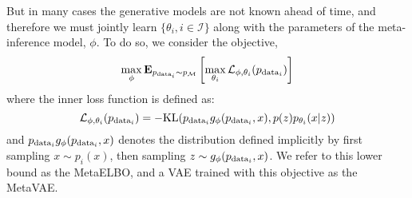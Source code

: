 But in many cases the generative models are not known ahead of time, and therefore we must jointly learn $\{\theta_i,  i \in \mathcal{I}\}$ along with the parameters of the meta-inference model, $\phi$. To do so, we consider the objective, 
\begin{equation}
\max_{\phi} \mathbf{E}_{p_{\textup{data}_i} \sim p_\mathcal{M}} \left[ \max_{\theta_i}  
\mathcal{L}_{\phi, \theta_i}(p_{\textup{data}_i}) 
\right]
\label{eqn:meta2_obj}
\end{equation}
where the inner loss function is defined as:
\begin{equation*}
    \mathcal{L}_{\phi, \theta_i}(p_{\textup{data}_i}) = -\textup{KL}(p_{\textup{data}_i} g_\phi(p_{\textup{data}_i}, x), p(z)p_{\theta_i}(x|z))
\end{equation*}
and $p_{\textup{data}_i} g_\phi(p_{\textup{data}_i}, x)$ denotes the distribution defined implicitly by first sampling $x \sim p_i(x)$, then sampling $z \sim g_\phi(p_{\textup{data}_i}, x)$. We refer to this lower bound as the MetaELBO, and a VAE trained with this objective as the MetaVAE. 

